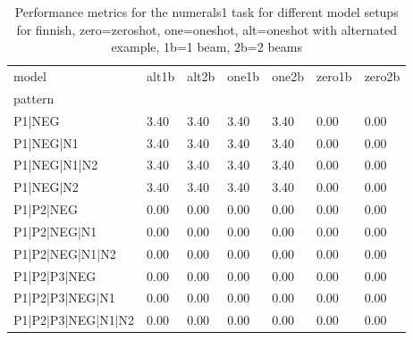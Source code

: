 \begin{table}[h]
\begin{tabular}{l|llllll}
\toprule
model & alt1b & alt2b & one1b & one2b & zero1b & zero2b \\
pattern &  &  &  &  &  &  \\
\midrule
P1|NEG & 3.40 & 3.40 & 3.40 & 3.40 & 0.00 & 0.00 \\
P1|NEG|N1 & 3.40 & 3.40 & 3.40 & 3.40 & 0.00 & 0.00 \\
P1|NEG|N1|N2 & 3.40 & 3.40 & 3.40 & 3.40 & 0.00 & 0.00 \\
P1|NEG|N2 & 3.40 & 3.40 & 3.40 & 3.40 & 0.00 & 0.00 \\
P1|P2|NEG & 0.00 & 0.00 & 0.00 & 0.00 & 0.00 & 0.00 \\
P1|P2|NEG|N1 & 0.00 & 0.00 & 0.00 & 0.00 & 0.00 & 0.00 \\
P1|P2|NEG|N1|N2 & 0.00 & 0.00 & 0.00 & 0.00 & 0.00 & 0.00 \\
P1|P2|P3|NEG & 0.00 & 0.00 & 0.00 & 0.00 & 0.00 & 0.00 \\
P1|P2|P3|NEG|N1 & 0.00 & 0.00 & 0.00 & 0.00 & 0.00 & 0.00 \\
P1|P2|P3|NEG|N1|N2 & 0.00 & 0.00 & 0.00 & 0.00 & 0.00 & 0.00 \\
\bottomrule
\end{tabular}
\caption{Performance metrics for the numerals1 task for different model setups for finnish, zero=zeroshot, one=oneshot, alt=oneshot with alternated example, 1b=1 beam, 2b=2 beams}
\label{tab:fi_numerals1_performance}
\end{table}
